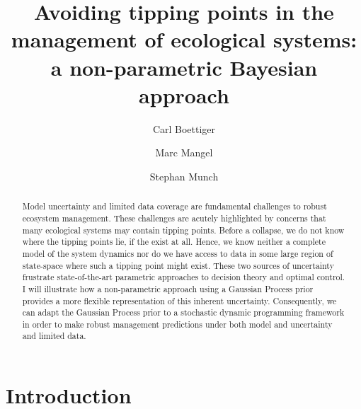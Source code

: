 \documentclass[author-year, review]{elsarticle} %
\begin{document}
\begin{frontmatter}

  \title{Avoiding tipping points in the management of ecological systems: a
non-parametric Bayesian approach}
    \author[cstar]{Carl Boettiger}
    \author[cstar]{Marc Mangel}
  
  
    \author[noaa]{Stephan Munch}
  
  
      \address[cstar]{Center for Stock Assessment Research, Department of Applied Math and
Statistics, University of California, Mail Stop SOE-2, Santa Cruz, CA
95064, USA}    
    \address[noaa]{Southwest Fisheries Science Center, National Oceanic and Atmospheric
Administration, 110 Shaffer Road, Santa Cruz, CA 95060, USA}    
  



  \begin{abstract}
  Model uncertainty and limited data coverage are fundamental challenges
  to robust ecosystem management. These challenges are acutely highlighted
  by concerns that many ecological systems may contain tipping points.
  Before a collapse, we do not know where the tipping points lie, if the
  exist at all. Hence, we know neither a complete model of the system
  dynamics nor do we have access to data in some large region of
  state-space where such a tipping point might exist. These two sources of
  uncertainty frustrate state-of-the-art parametric approaches to decision
  theory and optimal control. I will illustrate how a non-parametric
  approach using a Gaussian Process prior provides a more flexible
  representation of this inherent uncertainty. Consequently, we can adapt
  the Gaussian Process prior to a stochastic dynamic programming framework
  in order to make robust management predictions under both model and
  uncertainty and limited data.
  \end{abstract}

 \end{frontmatter}


\section{Introduction}\label{introduction}
\end{document}
